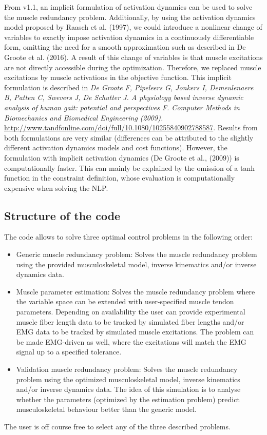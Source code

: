 \documentclass[a4paper,oneside,11pt]{article}
\begin{document}
From v1.1, an implicit formulation of activation dynamics can be used to solve the muscle redundancy problem. Additionally, by using the activation dynamics model proposed by Raasch et al. (1997), we could introduce a nonlinear change of variables to exactly impose activation dynamics in a continuously differentiable form, omitting the need for a smooth approximation such as described in De Groote et al. (2016). A result of this change of variables is that muscle excitations are not directly accessible during the optimization. Therefore, we replaced muscle excitations by muscle activations in the objective function. This implicit formulation is described in \textit{De Groote F, Pipeleers G, Jonkers I, Demeulenaere B, Patten C, Swevers J, De Schutter J. A physiology based inverse dynamic analysis of human gait: potential and perspectives F. Computer Methods in Biomechanics and Biomedical Engineering (2009).} \url{http://www.tandfonline.com/doi/full/10.1080/10255840902788587}. Results from both formulations are very similar (differences can be attributed to the slightly different activation dynamics models and cost functions). However, the formulation with implicit activation dynamics (De Groote et al., (2009)) is computationally faster. This can mainly be explained by the omission of a tanh function in the constraint definition, whose evaluation is computationally expensive when solving the NLP. \\

\subsection{Structure of the code}

The code allows to solve three optimal control problems in the following order: 
\begin{itemize}
	\item Generic muscle redundancy problem: Solves the muscle redundancy problem using the provided musculoskeletal model, inverse kinematics and/or inverse dynamics data. 
	\item Muscle parameter estimation: Solves the muscle redundancy problem where the variable space can be extended with user-specified muscle tendon parameters. Depending on availability the user can provide experimental muscle fiber length data to be tracked by simulated fiber lengths and/or EMG data to be tracked by simulated muscle excitations. The problem can be made EMG-driven as well, where the excitations will match the EMG signal up to a specified tolerance.
	\item Validation muscle redundancy problem: Solves the muscle redundancy problem using the optimized musculoskeletal model, inverse kinematics and/or inverse dynamics data. The idea of this simulation is to analyse whether the parameters (optimized by the estimation problem) predict musculoskeletal behaviour better than the generic model.
\end{itemize}
The user is off course free to select any of the three described problems. 
\end{document}
